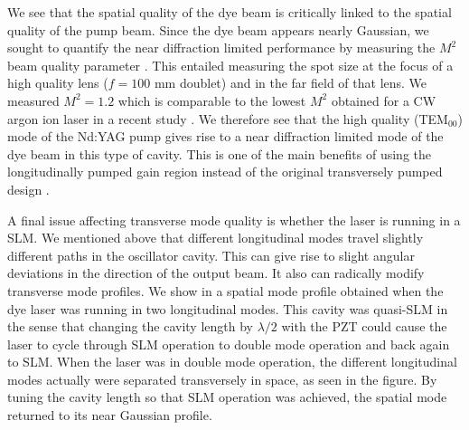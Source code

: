 We see that the spatial quality of the dye beam is critically linked to
the spatial quality of the pump beam.  Since the dye beam appears nearly
Gaussian, we sought to quantify the near diffraction limited performance by
measuring the $M^2$ beam quality parameter \cite{Ruff:92}.  This entailed
measuring the spot size at the focus of a high quality lens ($f=100$ mm doublet)
and in the far field of that lens.  We measured $M^2=1.2$ which is comparable
to the lowest $M^2$ obtained for a CW argon ion laser in a recent study
\cite{Johnston:92}.  We therefore see that the high quality 
(TEM$_{00}$) mode of the Nd:YAG pump gives rise to a near diffraction
limited mode of the dye beam in this type of cavity.  This is one of the
main benefits of using the longitudinally pumped gain region instead of
the original transversely pumped design \cite{Shoshan:77,Littman:78b}.

\begin{figure}[tb]
\bigskip
{}
\end{figure}

A final issue affecting transverse mode quality is whether the laser
is running in a SLM.  We mentioned above that different longitudinal modes travel
slightly different paths in the oscillator cavity.  This can give rise to
slight angular deviations in the direction of the output beam.  It also can
radically modify transverse mode profiles.  We show in  a
spatial mode profile obtained when the dye laser was running in two
longitudinal modes.  This cavity was quasi-SLM in the sense that changing the
cavity length by $\lambda/2$ with the PZT could cause the laser to cycle
through SLM operation to double mode operation and back again to SLM. When the
laser was in double mode operation, the different longitudinal modes actually
were separated transversely in space, as seen in the figure.  By tuning the
cavity length so that SLM operation was achieved, the spatial mode returned to
its near Gaussian profile.


\begin{figure}[tb]
\bigskip
{}
\end{figure}


